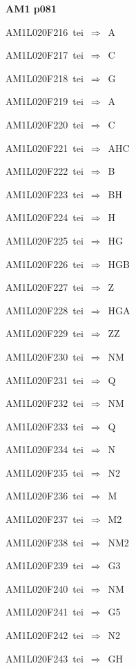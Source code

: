 \par\vfill\eject
{\bf\hfill AM1 p081\hfill\hbox{}}\par\bigskip
{\sixrm AM1L020F216\ {\sixit tei}\ }$\Rightarrow$\ A\par\smallskip
{\sixrm AM1L020F217\ {\sixit tei}\ }$\Rightarrow$\ C\par\smallskip
{\sixrm AM1L020F218\ {\sixit tei}\ }$\Rightarrow$\ G\par\smallskip
{\sixrm AM1L020F219\ {\sixit tei}\ }$\Rightarrow$\ A\par\smallskip
{\sixrm AM1L020F220\ {\sixit tei}\ }$\Rightarrow$\ C\par\smallskip
{\sixrm AM1L020F221\ {\sixit tei}\ }$\Rightarrow$\ AHC\par\smallskip
{\sixrm AM1L020F222\ {\sixit tei}\ }$\Rightarrow$\ B\par\smallskip
{\sixrm AM1L020F223\ {\sixit tei}\ }$\Rightarrow$\ BH\par\smallskip
{\sixrm AM1L020F224\ {\sixit tei}\ }$\Rightarrow$\ H\par\smallskip
{\sixrm AM1L020F225\ {\sixit tei}\ }$\Rightarrow$\ HG\par\smallskip
{\sixrm AM1L020F226\ {\sixit tei}\ }$\Rightarrow$\ HGB\par\smallskip
{\sixrm AM1L020F227\ {\sixit tei}\ }$\Rightarrow$\ Z\par\smallskip
{\sixrm AM1L020F228\ {\sixit tei}\ }$\Rightarrow$\ HGA\par\smallskip
{\sixrm AM1L020F229\ {\sixit tei}\ }$\Rightarrow$\ ZZ\par\smallskip
{\sixrm AM1L020F230\ {\sixit tei}\ }$\Rightarrow$\ NM\par\smallskip
{\sixrm AM1L020F231\ {\sixit tei}\ }$\Rightarrow$\ Q\par\smallskip
{\sixrm AM1L020F232\ {\sixit tei}\ }$\Rightarrow$\ NM\par\smallskip
{\sixrm AM1L020F233\ {\sixit tei}\ }$\Rightarrow$\ Q\par\smallskip
{\sixrm AM1L020F234\ {\sixit tei}\ }$\Rightarrow$\ N\par\smallskip
{\sixrm AM1L020F235\ {\sixit tei}\ }$\Rightarrow$\ N2\par\smallskip
{\sixrm AM1L020F236\ {\sixit tei}\ }$\Rightarrow$\ M\par\smallskip
{\sixrm AM1L020F237\ {\sixit tei}\ }$\Rightarrow$\ M2\par\smallskip
{\sixrm AM1L020F238\ {\sixit tei}\ }$\Rightarrow$\ NM2\par\smallskip
{\sixrm AM1L020F239\ {\sixit tei}\ }$\Rightarrow$\ G3\par\smallskip
{\sixrm AM1L020F240\ {\sixit tei}\ }$\Rightarrow$\ NM\par\smallskip
{\sixrm AM1L020F241\ {\sixit tei}\ }$\Rightarrow$\ G5\par\smallskip
{\sixrm AM1L020F242\ {\sixit tei}\ }$\Rightarrow$\ N2\par\smallskip
{\sixrm AM1L020F243\ {\sixit tei}\ }$\Rightarrow$\ GH\par\smallskip

